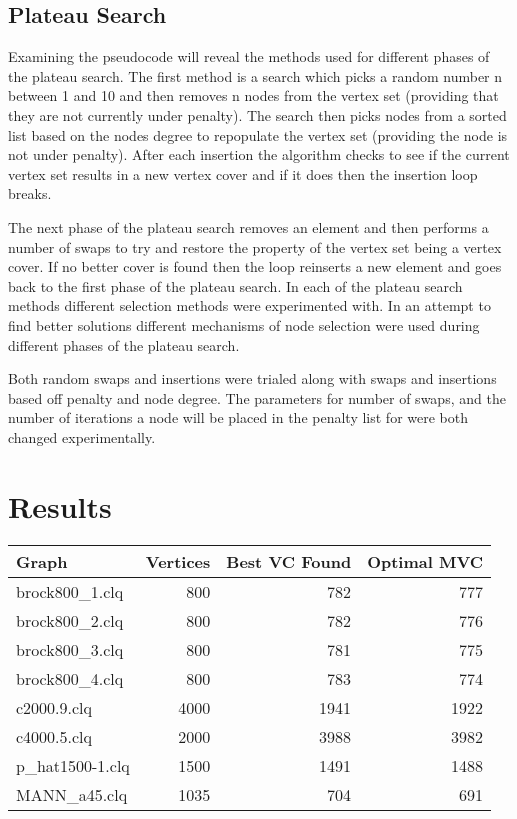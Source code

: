 \documentclass[conference,letterpaper]{IEEEtran}
\begin{document}
\subsection{Plateau Search}
\par Examining the pseudocode will reveal the methods used for different phases of the plateau search. The first method is a search which picks a random number n between 1 and 10 and then removes n nodes from the vertex set (providing that they are not currently under penalty). The search then picks nodes from a sorted list based on the nodes degree to repopulate the vertex set (providing the node is not under penalty). After each insertion the algorithm checks to see if the current vertex set results in a new vertex cover and if it does then the insertion loop breaks. 
\par The next phase of the plateau search removes an element and then performs a number of swaps to try and restore the property of the vertex set being a vertex cover. If no better cover is found then the loop reinserts a new element and goes back to the first phase of the plateau search. In each of the plateau search methods different selection methods were experimented with. In an attempt to find better solutions different mechanisms of node selection were used during different phases of the plateau search. 
\par Both random swaps and insertions were trialed along with swaps and insertions based off penalty and node degree. The parameters for number of swaps, and the number of iterations a node will be placed in the penalty list for were both changed experimentally.

\section{Results}
\begin{table}[!h]
    \begin{tabularx}{\linewidth}{|X|r|r|r|}
    \hline
    Graph   & Vertices & Best VC Found & Optimal MVC \\ \hline
    brock800\_1.clq  & 800 & 782                     & 777  \\
    brock800\_2.clq  & 800 & 782                     & 776  \\
    brock800\_3.clq  & 800 & 781                     & 775  \\
    brock800\_4.clq  & 800 & 783                     & 774  \\
    c2000.9.clq      & 4000 & 1941                   & 1922 \\
    c4000.5.clq      & 2000 & 3988                   & 3982 \\
    p\_hat1500-1.clq & 1500 & 1491                   & 1488 \\
    MANN\_a45.clq    & 1035 & 704                    & 691  \\ \hline
    \end{tabularx}
\end{table}
\end{document}
